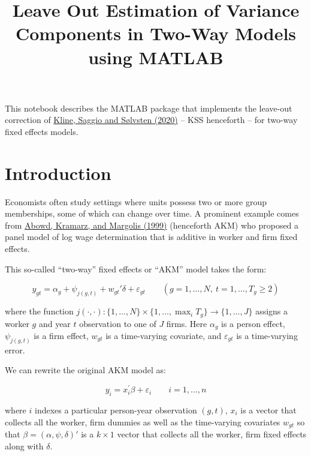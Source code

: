\documentclass[11pt]{article}
\title{Leave Out Estimation of Variance Components in Two-Way Models using MATLAB}
\begin{document}
    
        \maketitle
    
    

    
    This notebook describes the MATLAB package that implements the leave-out
correction of \href{https://eml.berkeley.edu/~pkline/papers/KSS2020.pdf}{Kline, Saggio and Sølvsten (2020)}  -- KSS henceforth -- for
two-way fixed effects models.

    \tableofcontents
    \newpage

    \hypertarget{introduction}{%
\section{Introduction}\label{introduction}}

Economists often study settings where units possess two or more group
memberships, some of which can change over time. A prominent example
comes from \href{https://www.uh.edu/~adkugler/Abowdetal.pdf}{Abowd, Kramarz, and Margolis (1999)} (henceforth AKM) who
proposed a panel model of log wage determination that is additive in
worker and firm fixed effects.

This so-called ``two-way'' fixed effects or ``AKM'' model takes the
form:

\begin{equation}
    y_{gt} =  \alpha_{{g}} + \psi_{j({g},t)} + w_{gt}'\delta +  \varepsilon_{gt}  \qquad({g}=1,\dots,N, \ t=1,\dots,T_{g} \ge 2)
\end{equation}

where the function
\(j(\cdot ,\cdot ):\lbrace 1,\dots ,N\rbrace \times \lbrace 1,\dots ,\max_i T_g \rbrace \to \lbrace 1,\dots ,J\rbrace\)
assigns a worker \(g\) and year \(t\) observation to one of \(J\) firms.
Here \(\alpha_g\) is a person effect, \(\psi_{j(g,t)}\) is a firm
effect, \(w_{gt}\) is a time-varying covariate, and \(\varepsilon_{gt}\)
is a time-varying error.

We can rewrite the original AKM model as:

\begin{equation}
y_i =x_i^{\prime } \beta +\varepsilon_i \qquad i=1,...,n
\end{equation}

where \(i\) indexes a particular person-year observation \((g,t)\),
\(x_i\) is a vector that collects all the worker, firm dummies as well
as the time-varying covariates \(w_{gt}\) so that
\(\beta =(\alpha ,\psi ,\delta )'\) is a \(k\times 1\) vector that
collects all the worker, firm fixed effects along with \(\delta\).
\end{document}
